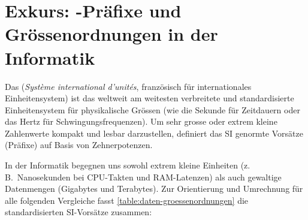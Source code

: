 \section{Exkurs: \texorpdfstring{}{SI}-Präfixe und Grössenordnungen in der Informatik}\label{sec:si_praefixe}

Das  (\emph{Système international d'unités}, französisch für internationales Einheitensystem) ist das weltweit am weitesten verbreitete und standardisierte Einheitensystem für physikalische Grössen (wie die Sekunde für Zeitdauern oder das Hertz für Schwingungsfrequenzen). Um sehr grosse oder extrem kleine Zahlenwerte kompakt und lesbar darzustellen, definiert das \gls{SI} genormte Vorsätze (Präfixe) auf Basis von Zehnerpotenzen.

In der Informatik begegnen uns sowohl extrem kleine Einheiten (z.\,B.\ Nanosekunden bei \gls{CPU}-Takten und \gls{RAM}-Latenzen) als auch gewaltige Datenmengen (Gigabytes und Terabytes). Zur Orientierung und Umrechnung für alle folgenden Vergleiche fasst \cref{table:daten-groessenordnungen} die standardisierten \gls{SI}-Vorsätze zusammen:

